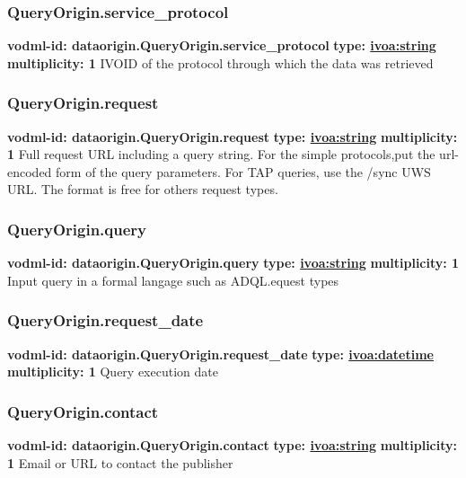     \subsubsection{QueryOrigin.service\_protocol}
      \textbf{vodml-id: dataorigin.QueryOrigin.service\_protocol} \newline
      \textbf{type: \hyperref[sect:ivoa]{ivoa:string}} \newline
      \textbf{multiplicity: 1} \newline 
      IVOID of the protocol through which the data was retrieved

    \subsubsection{QueryOrigin.request}
      \textbf{vodml-id: dataorigin.QueryOrigin.request} \newline
      \textbf{type: \hyperref[sect:ivoa]{ivoa:string}} \newline
      \textbf{multiplicity: 1} \newline 
      Full request URL including a query string. For the simple protocols,put the url-encoded form of the query parameters. For TAP queries, use the /sync UWS URL. The format is free for others request types.

    \subsubsection{QueryOrigin.query}
      \textbf{vodml-id: dataorigin.QueryOrigin.query} \newline
      \textbf{type: \hyperref[sect:ivoa]{ivoa:string}} \newline
      \textbf{multiplicity: 1} \newline 
      Input query in a formal langage such as ADQL.equest types

    \subsubsection{QueryOrigin.request\_date}
      \textbf{vodml-id: dataorigin.QueryOrigin.request\_date} \newline
      \textbf{type: \hyperref[sect:ivoa]{ivoa:datetime}} \newline
      \textbf{multiplicity: 1} \newline 
      Query execution date

    \subsubsection{QueryOrigin.contact}
      \textbf{vodml-id: dataorigin.QueryOrigin.contact} \newline
      \textbf{type: \hyperref[sect:ivoa]{ivoa:string}} \newline
      \textbf{multiplicity: 1} \newline 
      Email or URL to contact the publisher